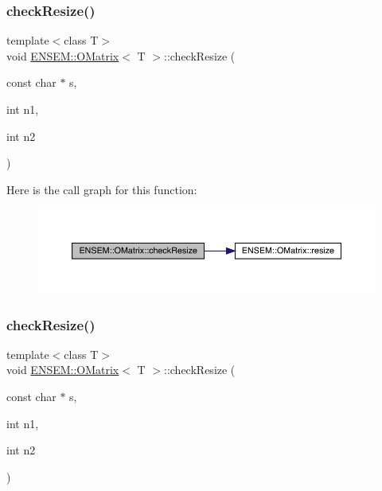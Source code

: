 \subsubsection{\texorpdfstring{checkResize()}{checkResize()}\hspace{0.1cm}{\footnotesize\ttfamily [4/9]}}
{\footnotesize\ttfamily template$<$class T$>$ \\
void \mbox{\hyperlink{classENSEM_1_1OMatrix}{E\+N\+S\+E\+M\+::\+O\+Matrix}}$<$ T $>$\+::check\+Resize (\begin{DoxyParamCaption}\item[{const char $\ast$}]{s,  }\item[{int}]{n1,  }\item[{int}]{n2 }\end{DoxyParamCaption})\hspace{0.3cm}{\ttfamily [inline]}}

Here is the call graph for this function\+:
\nopagebreak
\begin{figure}[H]
\begin{center}
\leavevmode
\includegraphics[width=350pt]{dd/d80/classENSEM_1_1OMatrix_aa9d9ff7da2027f85535b36b472ef125b_cgraph}
\end{center}
\end{figure}
\mbox{\label{classENSEM_1_1OMatrix_aa9d9ff7da2027f85535b36b472ef125b}} 
\subsubsection{\texorpdfstring{checkResize()}{checkResize()}\hspace{0.1cm}{\footnotesize\ttfamily [5/9]}}
{\footnotesize\ttfamily template$<$class T$>$ \\
void \mbox{\hyperlink{classENSEM_1_1OMatrix}{E\+N\+S\+E\+M\+::\+O\+Matrix}}$<$ T $>$\+::check\+Resize (\begin{DoxyParamCaption}\item[{const char $\ast$}]{s,  }\item[{int}]{n1,  }\item[{int}]{n2 }\end{DoxyParamCaption})\hspace{0.3cm}{\ttfamily [inline]}}

